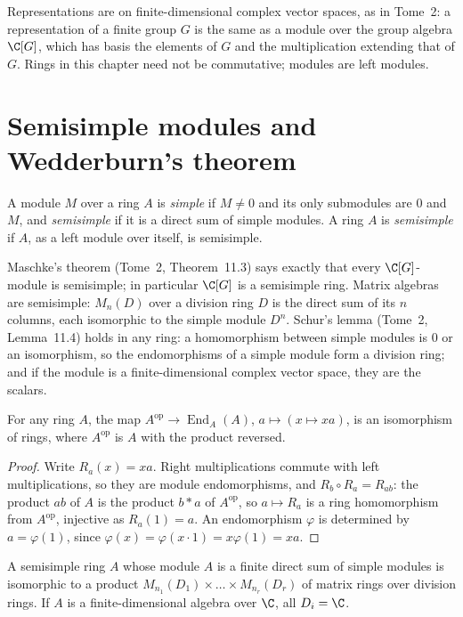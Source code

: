 Representations are on finite-dimensional complex vector spaces, as in Tome~2: a representation of a finite group $G$ is the same as a module over the group algebra $\C[G]$, which has basis the elements of $G$ and
the multiplication extending that of $G$. Rings in this chapter need not be commutative; modules are left modules.

\section{Semisimple modules and Wedderburn's theorem}

\begin{definition}\label{def:semisimple}
A module $M$ over a ring $A$ is \emph{simple} if $M\ne0$ and its only submodules are $0$ and $M$, and \emph{semisimple} if it is a direct sum of simple modules. A ring $A$ is \emph{semisimple} if $A$, as a left module over itself,
is semisimple.
\end{definition}

Maschke's theorem (Tome~2, Theorem~11.3) says exactly that every $\C[G]$-module is semisimple; in particular $\C[G]$ is a semisimple ring. Matrix algebras are semisimple: $M_n(D)$ over a division ring $D$ is the direct sum of its
$n$ columns, each isomorphic to the simple module $D^n$. Schur's lemma (Tome~2, Lemma~11.4) holds in any ring: a homomorphism between simple modules is $0$ or an isomorphism, so the endomorphisms of a simple module form a
division ring; and if the module is a finite-dimensional complex vector space, they are the scalars.

\begin{lemma}\label{lem:endA}
For any ring $A$, the map $A^{\mathrm{op}}\to\operatorname{End}_A(A)$, $a\mapsto(x\mapsto xa)$, is an isomorphism of rings, where $A^{\mathrm{op}}$ is $A$ with the product reversed.
\end{lemma}

\begin{proof}
Write $R_a(x)=xa$. Right multiplications commute with left multiplications, so they are module endomorphisms, and $R_b\circ R_a=R_{ab}$: the product $ab$ of $A$ is the product $b\ast a$ of $A^{\mathrm{op}}$, so
$a\mapsto R_a$ is a ring homomorphism from $A^{\mathrm{op}}$, injective as $R_a(1)=a$. An
endomorphism $\varphi$ is determined by $a=\varphi(1)$, since $\varphi(x)=\varphi(x\cdot1)=x\varphi(1)=xa$.
\end{proof}

\begin{theorem}[Wedderburn, 1908]\label{thm:wedderburn}
A semisimple ring $A$ whose module $A$ is a finite direct sum of simple modules is isomorphic to a product $M_{n_1}(D_1)\times\dots\times M_{n_r}(D_r)$ of matrix rings over division rings. If $A$ is a finite-dimensional algebra over $\C$,
all $D_i=\C$.
\end{theorem}

